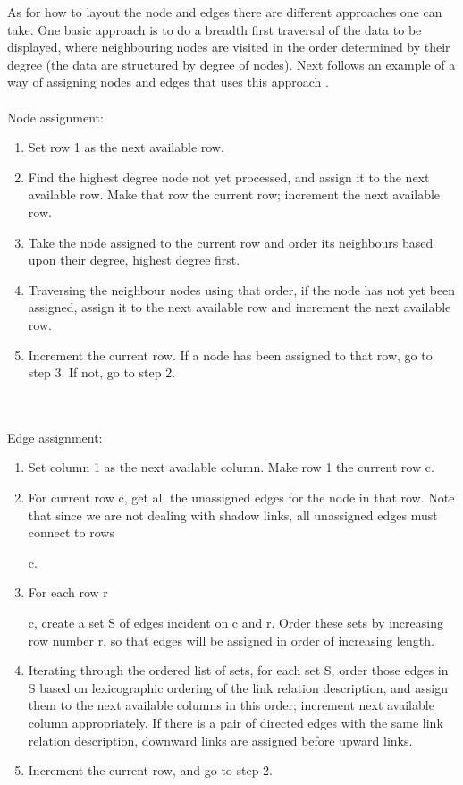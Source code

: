 \documentclass[a4paper,11pt]{kth-mag}
\begin{document}
As for how to layout the node and edges there are different approaches one can take. One basic approach is to do a breadth first traversal of the data to be displayed, where neighbouring nodes
are visited in the order determined by their degree (the data are structured by degree of nodes). Next follows an example of a way of assigning nodes and edges that uses this approach \cite{23102059}.
\\
\\
Node assignment:
\begin{enumerate}
	\item Set row 1 as the next available row.
	\item Find the highest degree node not yet processed, and
		  assign it to the next available row. Make that row the
		  current row; increment the next available row.
	\item Take the node assigned to the current row and
		  order its neighbours based upon their degree, highest
		  degree first.
	\item Traversing the neighbour nodes using that order, if the
		  node has not yet been assigned, assign it to the next
		  available row and increment the next available row.
	\item Increment the current row. If a node has been assigned
		  to that row, go to step 3. If not, go to step 2.
\end{enumerate}
\\
\\
Edge assignment:
\begin{enumerate}
	\item Set column 1 as the next available column. Make row
		  1 the current row c.
	\item For current row c, get all the unassigned edges for the
		  node in that row. Note that since we are not dealing
		  with shadow links, all unassigned edges must connect
		  to rows \begin{mathsurround} \math \ge \end{mathsurround} c.
	\item For each row r \begin{mathsurround} \math \ge \end{mathsurround} c, create a set S of edges incident on
		  c and r. Order these sets by increasing row number r,
		  so that edges will be assigned in order of increasing
		  length.
	\item Iterating through the ordered list of sets, for each set
		  S, order those edges in S based on lexicographic
		  ordering of the link relation description, and assign
		  them to the next available columns in this order;
		  increment next available column appropriately. If
		  there is a pair of directed edges with the same link
		  relation description, downward links are assigned
		  before upward links.
	\item Increment the current row, and go to step 2.
\end{enumerate}
\end{document}
